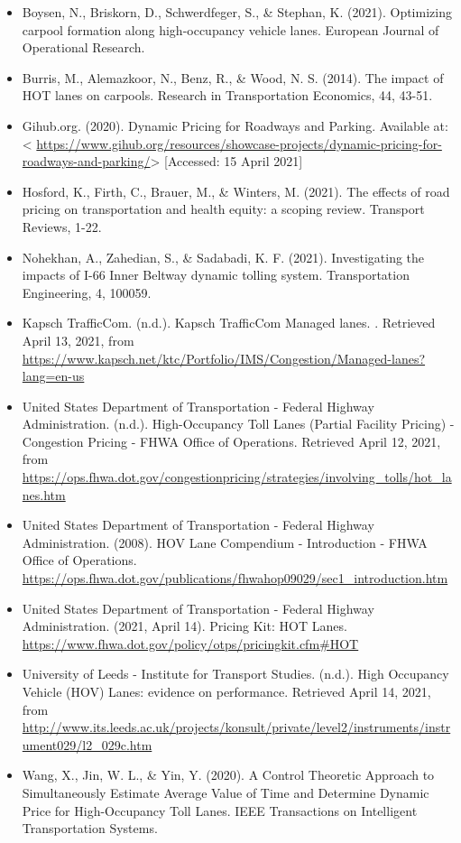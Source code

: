\documentclass[
]{book}
\providecommand{\tightlist}{%
  \setlength{\itemsep}{0pt}\setlength{\parskip}{0pt}}
\begin{document}
\begin{itemize}
\tightlist
\item
  Boysen, N., Briskorn, D., Schwerdfeger, S., \& Stephan, K. (2021). Optimizing carpool formation along high-occupancy vehicle lanes. European Journal of Operational Research.
\item
  Burris, M., Alemazkoor, N., Benz, R., \& Wood, N. S. (2014). The impact of HOT lanes on carpools. Research in Transportation Economics, 44, 43-51.
\item
  Gihub.org. (2020). Dynamic Pricing for Roadways and Parking. Available at: \textless{} \url{https://www.gihub.org/resources/showcase-projects/dynamic-pricing-for-roadways-and-parking/}\textgreater{} {[}Accessed: 15 April 2021{]}
\item
  Hosford, K., Firth, C., Brauer, M., \& Winters, M. (2021). The effects of road pricing on transportation and health equity: a scoping review. Transport Reviews, 1-22.
\item
  Nohekhan, A., Zahedian, S., \& Sadabadi, K. F. (2021). Investigating the impacts of I-66 Inner Beltway dynamic tolling system. Transportation Engineering, 4, 100059.
\item
  Kapsch TrafficCom. (n.d.). Kapsch TrafficCom \textbar{} Managed lanes. . Retrieved April 13, 2021, from \url{https://www.kapsch.net/ktc/Portfolio/IMS/Congestion/Managed-lanes?lang=en-us}
\item
  United States Department of Transportation - Federal Highway Administration. (n.d.). High-Occupancy Toll Lanes (Partial Facility Pricing) - Congestion Pricing - FHWA Office of Operations. Retrieved April 12, 2021, from \url{https://ops.fhwa.dot.gov/congestionpricing/strategies/involving_tolls/hot_lanes.htm}
\item
  United States Department of Transportation - Federal Highway Administration. (2008). HOV Lane Compendium - Introduction - FHWA Office of Operations. \url{https://ops.fhwa.dot.gov/publications/fhwahop09029/sec1_introduction.htm}
\item
  United States Department of Transportation - Federal Highway Administration. (2021, April 14). Pricing Kit: HOT Lanes. \url{https://www.fhwa.dot.gov/policy/otps/pricingkit.cfm\#HOT}
\item
  University of Leeds - Institute for Transport Studies. (n.d.). High Occupancy Vehicle (HOV) Lanes: evidence on performance. Retrieved April 14, 2021, from \url{http://www.its.leeds.ac.uk/projects/konsult/private/level2/instruments/instrument029/l2_029c.htm}
\item
  Wang, X., Jin, W. L., \& Yin, Y. (2020). A Control Theoretic Approach to Simultaneously Estimate Average Value of Time and Determine Dynamic Price for High-Occupancy Toll Lanes. IEEE Transactions on Intelligent Transportation Systems.
\end{itemize}
\end{document}
